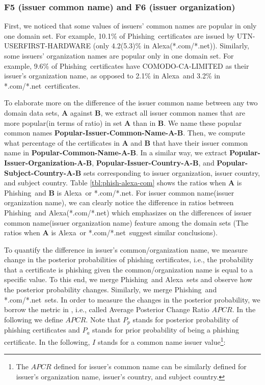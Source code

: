 \documentclass[twocolumn]{article}
\newcommand{\Alexa}{\textsf{Alexa}}
\newcommand{\phishing}{\textsf{Phishing}}
\newcommand{\comnet}{\textsf{*.com/*.net}}
\begin{document}
\subsubsection*{F5 (issuer common name) and F6 (issuer organization)}\noindent
First, we noticed that some values of issuers' common names are popular in only one domain set. For example, 10.1\% of  \phishing\ certificates are 
issued by UTN-USERFIRST-HARDWARE (only 4.2(5.3)\% in \Alexa(\comnet)). Similarly, some issuers'  organization names are popular only in one domain set. For example, 9.6\% of  \phishing\ certificates have COMODO-CA-LIMITED
as their issuer's organization name, as opposed to 2.1\% in \Alexa\ and 3.2\% in \comnet\ certificates. 

To elaborate more on the difference of the issuer common name between any two domain data sets, \textbf{A} against  \textbf{B}, we extract all issuer common names that are more popular(in terms of ratio) in set \textbf{A} than in \textbf{B}. We name these popular common names \textbf{Popular-Issuer-Common-Name-A-B}. Then, we compute what percentage of the certificates in \textbf{A} and \textbf{B} that have their issuer common name in \textbf{Popular-Common-Name-A-B}. In a similar way, we extract \textbf{Popular-Issuer-Organization-A-B}, \textbf{Popular-Issuer-Country-A-B}, and \textbf{Popular-Subject-Country-A-B}  sets corresponding to issuer organization, issuer country, and subject country. Table \ref{tbl:phish-alexa-com} shows the ratios when \textbf{A} is \phishing\ and \textbf{B} is \Alexa\ or \comnet. For issuer common name(issuer organization name), we can clearly notice the difference in ratios between \phishing\ and \Alexa(\comnet)  which emphasizes on the differences of issuer common name(issuer organization name) feature among the domain sets (The ratios when \textbf{A} is \Alexa\ or \comnet\ suggest similar conclusions). 

To quantify the difference in issuer's common/organization name, we measure change in the posterior probabilities of phishing certificates, i.e., the probability that a certificate is phishing given the common/organization name is equal to a specific value. To this end, we merge \phishing\ and \Alexa\ sets and observe how the posterior probability changes. Similarly, we merge \phishing\ and \comnet\ sets. In order to measure the changes in the posterior probability, we borrow the metric in \cite{ads-portal-class}, i.e., called Average Posterior Change Ratio $APCR$. In the following we define $APCR$. Note that $P_p$ stands for posterior probability of phishing certificates and $P_a$ stands for prior probability of being a phishing certificate. In the following, $I$ stands for a common name issuer value\footnote{The $APCR$ defined for issuer's common name  can be similarly defined for issuer's organization name, issuer's country, and subject country.}:
\end{document}
